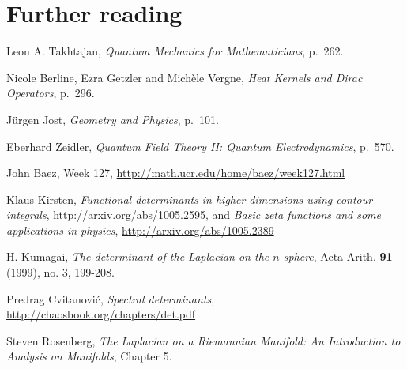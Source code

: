\documentclass{article}
\theoremstyle{definition}
\begin{document}
\section{Further reading}
Leon A. Takhtajan, {\em Quantum Mechanics for Mathematicians}, p.~262.

Nicole Berline, Ezra Getzler and Mich\`ele Vergne, {\em Heat Kernels and Dirac Operators}, p.~296.

J\"urgen Jost, {\em Geometry and Physics}, p.~101.

Eberhard Zeidler, {\em Quantum Field Theory II: Quantum Electrodynamics}, p.~570.

John Baez, Week 127, \url{http://math.ucr.edu/home/baez/week127.html}

Klaus Kirsten, {\em Functional determinants in higher dimensions using contour integrals}, \url{http://arxiv.org/abs/1005.2595},
and {\em Basic zeta functions and some applications in physics}, \url{http://arxiv.org/abs/1005.2389}

H. Kumagai, {\em The determinant of the Laplacian on the $n$-sphere}, Acta Arith. \textbf{91} (1999), no. 3, 199-208. 

Predrag Cvitanovi\'c, {\em Spectral determinants}, \url{http://chaosbook.org/chapters/det.pdf}

Steven Rosenberg, {\em The Laplacian on a Riemannian Manifold: An Introduction to Analysis on Manifolds}, Chapter 5.
\end{document}
